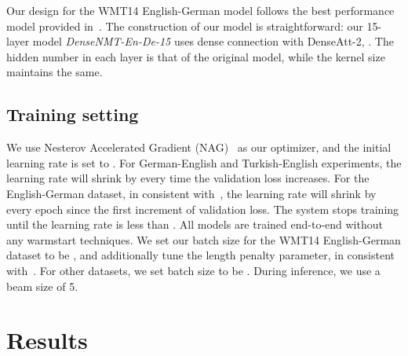 \documentclass[11pt,a4paper]{article}
\begin{document}
Our design for the WMT14 English-German model follows the best performance model provided in~\cite{convs2s}. 
The construction of our model is straightforward: our 15-layer model \emph{DenseNMT-En-De-15} uses dense connection with DenseAtt-2, . The hidden number in each layer is  that of the original model, while the kernel size maintains the same. 



\subsection{Training setting}
We use Nesterov Accelerated Gradient (NAG)~\cite{nesterov1983method} as our optimizer, and the initial learning rate is set to . For German-English and Turkish-English experiments, the learning rate will shrink by  every time the validation loss increases. For the English-German dataset, in consistent with~\cite{convs2s}, the learning rate will shrink by  every epoch since the first increment of validation loss. The system stops training until the learning rate is less than . 
All models are trained end-to-end without any warmstart techniques. 
We set our batch size for the WMT14 English-German dataset to be , and additionally tune the length penalty parameter, in consistent with~\cite{convs2s}. For other datasets, we set batch size to be .
During inference, we use a beam size of 5.



\section{Results}
\end{document}
